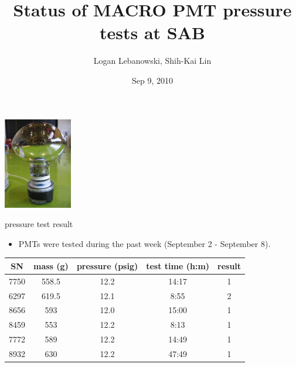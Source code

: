 \documentclass{beamer}
\begin{document}
\title{Status of MACRO PMT pressure tests at SAB}
\author{Logan Lebanowski, Shih-Kai Lin}
\date{Sep 9, 2010}

\begin{frame}
\begin{center}
\includegraphics[height=4cm]{IMG_1048.jpg}
\end{center}
\titlepage
\end{frame}



\begin{frame}{pressure test result}
\begin{itemize}
 \item PMTs were tested during the past week (September 2 - September 8).
\end{itemize}
\begin{tabular}{c|c|c|c|c}
	SN & mass (g) & pressure (psig) & test time (h:m) & result \\
	\hline
	\hline
	7750 & 558.5 & 12.2 & 14:17 & 1 \\
	6297 & 619.5 & 12.1 & 8:55 & 2 \\
	8656 & 593 & 12.0 & 15:00 & 1 \\
	8459 & 553 & 12.2 & 8:13 & 1 \\
	7772 & 589 & 12.2 & 14:49 & 1 \\
	8932 & 630 & 12.2 & 47:49 & 1 \\
\end{tabular}
\end{frame}



\end{document}
